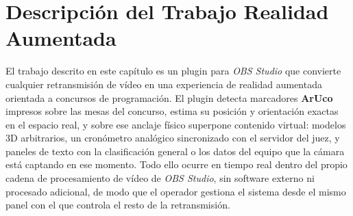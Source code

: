 \chapter{Descripción del Trabajo Realidad Aumentada}
\label{cap:descripcionTrabajo}





El trabajo descrito en este capítulo es un plugin para \textit{OBS Studio} que convierte cualquier retransmisión de vídeo en una experiencia de realidad aumentada orientada a concursos de programación. El plugin detecta marcadores \textbf{ArUco} \citep{GarridoJurado2014} impresos sobre las mesas del concurso, estima su posición y orientación exactas en el espacio real, y sobre ese anclaje físico superpone contenido virtual: modelos 3D arbitrarios, un cronómetro analógico sincronizado con el servidor del juez, y paneles de texto con la clasificación general o los datos del equipo que la cámara está captando en ese momento. Todo ello ocurre en tiempo real dentro del propio cadena de procesamiento de vídeo de \textit{OBS Studio}, sin software externo ni procesado adicional, de modo que el operador gestiona el sistema desde el mismo panel con el que controla el resto de la retransmisión.

